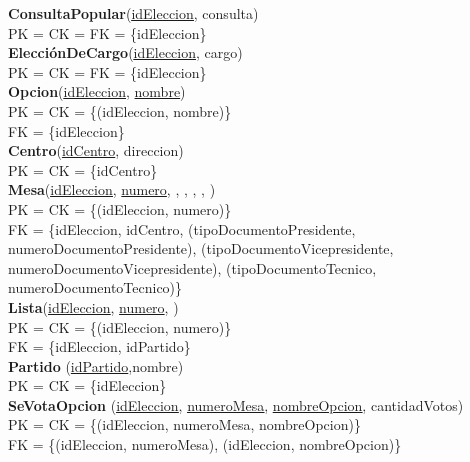 \documentclass[10pt,a4paper]{article}
\begin{document}
\textbf{ConsultaPopular}(\underline{\underline{idEleccion}}, consulta)\\
PK = CK = FK = \{idEleccion\}\\

\textbf{ElecciónDeCargo}(\underline{\underline{idEleccion}}, cargo)\\
PK = CK = FK = \{idEleccion\}\\

\textbf{Opcion}(\underline{\underline{idEleccion}}, \underline{nombre})\\
PK = CK = \{(idEleccion, nombre)\}\\
FK = \{idEleccion\}\\

\textbf{Centro}(\underline{idCentro}, direccion)\\
PK = CK = \{idCentro\}\\

\textbf{Mesa}(\underline{\underline{idEleccion}}, \underline{numero}, , , , , )\\
PK = CK = \{(idEleccion, numero)\}\\
FK = \{idEleccion, idCentro, (tipoDocumentoPresidente, numeroDocumentoPresidente), (tipoDocumentoVicepresidente, numeroDocumentoVicepresidente), (tipoDocumentoTecnico, numeroDocumentoTecnico)\}\\

\textbf{Lista}(\underline{\underline{idEleccion}}, \underline{numero}, )\\
PK = CK = \{(idEleccion, numero)\}\\
FK = \{idEleccion, idPartido\}\\

\textbf{Partido}
(\underline{idPartido},nombre)\\
PK = CK = \{idEleccion\}\\

\textbf{SeVotaOpcion}
(\underline{\underline{idEleccion}}, \underline{\underline{numeroMesa}}, \underline{\underline{nombreOpcion}}, cantidadVotos)\\
PK = CK = \{(idEleccion, numeroMesa, nombreOpcion)\}\\
FK = \{(idEleccion, numeroMesa), (idEleccion, nombreOpcion)\}\\
\end{document}
